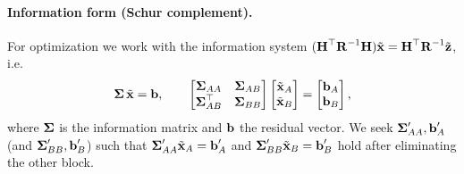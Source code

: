\paragraph{Information form (Schur complement).} For optimization we work with the information system $(\vect{H}\trans\vect{R}^{-1}\vect{H})\tilde{\vect{x}} = \vect{H}\trans\vect{R}^{-1}\tilde{\vect{z}}$, i.e.
\begin{align}
\vect{\Sigma}\,\tilde{\vect{x}} = \vect{b}, \qquad
\begin{bmatrix} \vect{\Sigma}_{AA} & \vect{\Sigma}_{AB} \\ \vect{\Sigma}_{AB}\trans & \vect{\Sigma}_{BB} \end{bmatrix}
\begin{bmatrix} \tilde{\vect{x}}_A \\ \tilde{\vect{x}}_B \end{bmatrix}
= \begin{bmatrix} \vect{b}_A \\ \vect{b}_B \end{bmatrix},
\end{align}
where $\vect{\Sigma}$ is the information matrix and $\vect{b}$ the residual vector. We seek $\vect{\Sigma}_{AA}',\vect{b}_A'$ (and $\vect{\Sigma}_{BB}',\vect{b}_B'$) such that $\vect{\Sigma}_{AA}'\tilde{\vect{x}}_A = \vect{b}_A'$ and $\vect{\Sigma}_{BB}'\tilde{\vect{x}}_B = \vect{b}_B'$ hold after eliminating the other block.

